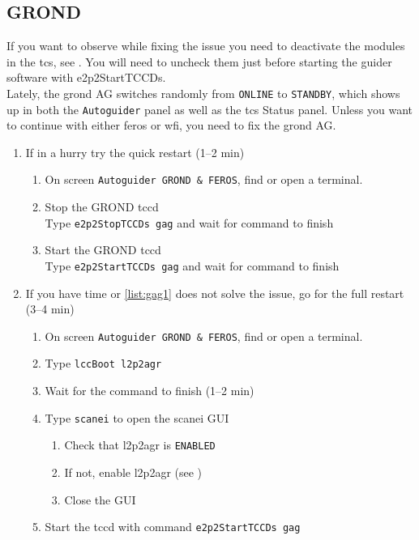 \documentclass[11pt,fleqn,a4paper]{book}
\begin{document}
\subsection{GROND}
If you want to observe while fixing the issue you need to deactivate the modules in the \gls{tcs}, see .  You will need to uncheck them just before starting the guider software with \gls{e2p2StartTCCDs}.\\
Lately, the \gls{grond} AG switches randomly from \texttt{ONLINE} to \texttt{STANDBY}, which shows up in both the \texttt{Autoguider} panel as well as the \gls{tcs} Status panel. Unless you want to continue with either \gls{feros} or \gls{wfi}, you need to fix the \gls{grond} AG. 
\label{proc:restartgag}
\begin{enumerate}
   \item\label{list:gag1} If in a hurry try the quick restart (1--2 min)
   \begin{enumerate}
       \item On screen \texttt{Autoguider GROND \& FEROS}, find or open a terminal.
       \item Stop the GROND \acrlong{tccd}\\
             Type \texttt{\gls{e2p2StopTCCDs} gag} and wait for command to finish
       \item Start the GROND \acrlong{tccd}\\
             Type \texttt{\gls{e2p2StartTCCDs} gag} and wait for command to finish
   \end{enumerate}
   \item If you have time or \ref{list:gag1} does not solve the issue,
   go for the full restart (3--4 min)
   \begin{enumerate}
       \item On screen \texttt{Autoguider GROND \& FEROS}, find or open a terminal.
       \item Type \texttt{\gls{lccBoot} \gls{l2p2agr}}
       \item Wait for the command to finish (1--2 min)
       \item Type \texttt{scanei} to open the scanei GUI
       \begin{enumerate}
	   \item Check that l2p2agr is \texttt{ENABLED}
	   \item If not, enable l2p2agr (see )
	   \item Close the GUI
       \end{enumerate}
       \item Start the \acrlong{tccd} with command \texttt{\gls{e2p2StartTCCDs} gag}
   \end{enumerate}
\end{enumerate}
\end{document}
